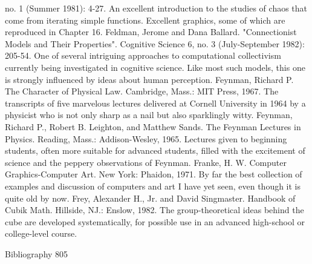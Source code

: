   no. 1 (Summer 1981): 4-27. An excellent introduction to the studies of chaos that come
  from iterating simple functions. Excellent graphics, some of which are reproduced in
  Chapter 16.
Feldman, Jerome and Dana Ballard. "Connectionist Models and Their Properties". Cognitive
  Science 6, no. 3 (July-September 1982): 205-54. One of several intriguing approaches to
  computational collectivism currently being investigated in cognitive science. Like most
  such models, this one is strongly influenced by ideas about human perception.
Feynman, Richard P. The Character of Physical Law. Cambridge, Mass.: MIT Press, 1967.
  The transcripts of five marvelous lectures delivered at Cornell University in 1964 by a
  physicist who is not only sharp as a nail but also sparklingly witty.
Feynman, Richard P., Robert B. Leighton, and Matthew Sands. The Feynman Lectures in
  Physics. Reading, Mass.: Addison-Wesley, 1965. Lectures given to beginning students,
  often more suitable for advanced students, filled with the excitement of science and the
  peppery observations of Feynman.
Franke, H. W. Computer Graphics-Computer Art. New York: Phaidon, 1971. By far the best
  collection of examples and discussion of computers and art I have yet seen, even though it
  is quite old by now.
Frey, Alexander H., Jr. and David Singmaster. Handbook of Cubik Math. Hillside, NJ.:
  Enslow, 1982. The group-theoretical ideas behind the cube are developed systematically,
  for possible use in an advanced high-school or college-level course.

Bibliography                                                                              805

